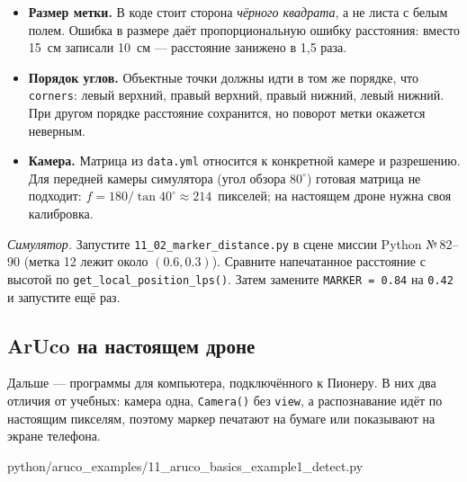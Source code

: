 \begin{infobox}
\begin{itemize}
    \item \textbf{Размер метки.} В коде стоит сторона \emph{чёрного квадрата}, а не листа с белым полем. Ошибка в размере даёт пропорциональную ошибку расстояния: вместо 15~см записали 10~см --- расстояние занижено в 1,5 раза.
    \item \textbf{Порядок углов.} Объектные точки должны идти в том же порядке, что \verb|corners|: левый верхний, правый верхний, правый нижний, левый нижний. При другом порядке расстояние сохранится, но поворот метки окажется неверным.
    \item \textbf{Камера.} Матрица из \texttt{data.yml} относится к конкретной камере и разрешению. Для передней камеры симулятора (угол обзора $80^\circ$) готовая матрица не подходит: $f = 180/\tan 40^\circ \approx 214$~пикселей; на настоящем дроне нужна своя калибровка.
\end{itemize}
\end{infobox}

\begin{taskbox}
\emph{Симулятор.} Запустите \texttt{11\_02\_marker\_distance.py} в сцене миссии Python №\,82--90 (метка 12 лежит около $(0.6, 0.3)$). Сравните напечатанное расстояние с высотой по \verb|get_local_position_lps()|. Затем замените \verb|MARKER = 0.84| на \verb|0.42| и запустите ещё раз.
\end{taskbox}

\subsection{ArUco на настоящем дроне}
\label{sec:python-aruco-real}

Дальше --- программы для компьютера, подключённого к Пионеру. В них два отличия от учебных: камера одна, \verb|Camera()| без \verb|view|, а распознавание идёт по настоящим пикселям, поэтому маркер печатают на бумаге или показывают на экране телефона.

\begin{codefile}[python]{python/aruco_examples/11_aruco_basics_example1_detect.py}
\end{codefile}

